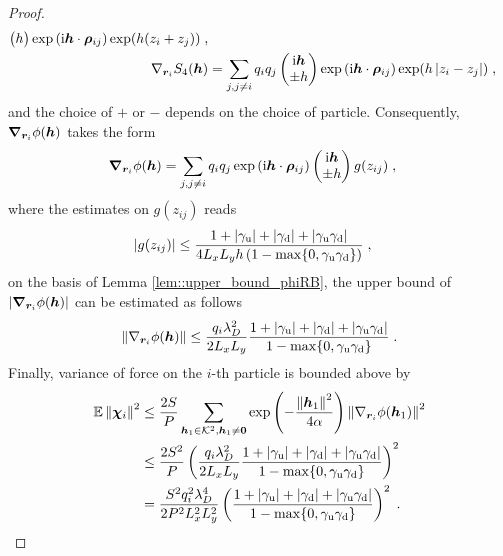\begin{proof}
\begin{align*}
\begin{pmatrix}
 h  \end{pmatrix}\exp{(\mathrm{i} \boldsymbol{h} \cdot \boldsymbol{\rho}_{ij})}\exp(h(z_i+z_j))\;,\\
 \nabla_{\bm{r}_i} S_4(\boldsymbol{h})&=\sum_{j,j\neq i}q_iq_j   \begin{pmatrix} \mathrm{i} \boldsymbol{h} \\
 \pm h  \end{pmatrix}\exp{(\mathrm{i} \boldsymbol{h} \cdot \boldsymbol{\rho}_{ij})}\exp(h\left\lvert z_i-z_j\right\rvert)\;,\\
\end{align*}
and  the choice of $+$ or $-$ depends on the choice of particle. Consequently, $\boldsymbol{\nabla}_{\boldsymbol{r}_i} \phi(\boldsymbol{h})$ takes the form
\begin{align*}
  \boldsymbol{\nabla}_{\boldsymbol{r}_i} \phi(\boldsymbol{h})  &=\sum_{j,j\neq i}q_iq_j  \exp{(\mathrm{i} \boldsymbol{h} \cdot \boldsymbol{\rho}_{ij})} \begin{pmatrix} \mathrm{i} \boldsymbol{h} \\
 \pm h  \end{pmatrix}g(z_{ij})\;,
\end{align*}
where the estimates on $g(z_{ij})$ reads
\begin{align*}
  \left\lvert g(z_{ij})  \right\rvert&\leq  \frac{1+\left\lvert\gamma_{\mathrm{u}}\right\rvert+\left\lvert\gamma_{\mathrm{d}}\right\rvert+\left\lvert\gamma_{\mathrm{u}}\gamma_{\mathrm{d}}\right\rvert}{4  L_xL_y h \left(1-\max\{0,\gamma_{\mathrm{u}}\gamma_{\mathrm{d}}\}\right)}\;,
\end{align*}
on the basis of Lemma \ref{lem::upper_bound_phiRB}, the upper bound of~$\lvert\boldsymbol{\nabla}_{\boldsymbol{r}_i} \phi(\boldsymbol{h})\rvert$ can be estimated as follows 
\begin{equation}
  \left\lVert\nabla_{\bm{r}_i}\phi(\boldsymbol{h})\right\rVert\leq \frac{q_i\lambda_{D}^2}{2  L_xL_y}    \frac{1+\left\lvert\gamma_{\mathrm{u}}\right\rvert+\left\lvert\gamma_{\mathrm{d}}\right\rvert+\left\lvert\gamma_{\mathrm{u}}\gamma_{\mathrm{d}}\right\rvert}{1-\max\{0,\gamma_{\mathrm{u}}\gamma_{\mathrm{d}}\}}\;.
\end{equation}
Finally,  variance of force on the $i$-th particle is bounded above by
\begin{align*}
   	\mathbb{E}\left\lVert\boldsymbol{\chi}_{i}\right\rVert^2&\leq   \frac{2S}{P}\sum_{\bm{h}_1\in\mathcal{K}^2, \bm{h}_1\neq \bm{0}}\exp\left(-\frac{\left\lVert\boldsymbol{h}_1\right\rVert^2}{4\alpha}\right)\left\lVert\nabla_{\bm{r}_i}\phi(\boldsymbol{h}_1)\right\rVert^2\\
    &\leq  \frac{2S^2}{P}\left(\frac{q_i\lambda_{D}^2}{2  L_xL_y}    \frac{1+\left\lvert\gamma_{\mathrm{u}}\right\rvert+\left\lvert\gamma_{\mathrm{d}}\right\rvert+\left\lvert\gamma_{\mathrm{u}}\gamma_{\mathrm{d}}\right\rvert}{1-\max\{0,\gamma_{\mathrm{u}}\gamma_{\mathrm{d}}\}}\right)^2\\
    &= \frac{ S^2q_i^2\lambda_{D}^4}{2P ^2 L_x^2L_y^2}\left( \frac{1+\left\lvert\gamma_{\mathrm{u}}\right\rvert+\left\lvert\gamma_{\mathrm{d}}\right\rvert+\left\lvert\gamma_{\mathrm{u}}\gamma_{\mathrm{d}}\right\rvert}{1-\max\{0,\gamma_{\mathrm{u}}\gamma_{\mathrm{d}}\}}\right)^2\;.
\end{align*}
\end{proof}
